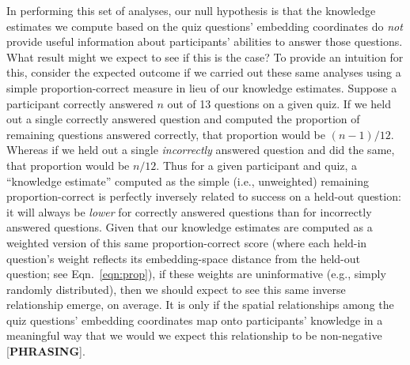 \documentclass[10pt]{article}
\begin{document}
In performing this set of analyses, our null hypothesis is that the knowledge estimates we compute based on the quiz questions' embedding coordinates do \textit{not} provide useful information about participants' abilities to answer those questions. 
What result might we expect to see if this is the case? 
To provide an intuition for this, consider the expected outcome if we carried out these same analyses using a simple proportion-correct measure in lieu of our knowledge estimates. 
Suppose a participant correctly answered $n$ out of 13 questions on a given quiz. 
If we held out a single correctly answered question and computed the proportion of remaining questions answered correctly, that proportion would be $(n - 1) / 12$. 
Whereas if we held out a single \textit{incorrectly} answered question and did the same, that proportion would be $n / 12$. 
Thus for a given participant and quiz, a ``knowledge estimate'' computed as the simple (i.e., unweighted) remaining proportion-correct is perfectly inversely related to success on a held-out question: it will always be \textit{lower} for correctly answered questions than for incorrectly answered questions. 
Given that our knowledge estimates are computed as a weighted version of this same proportion-correct score (where each held-in question's weight reflects its embedding-space distance from the held-out question; see Eqn.~\ref{eqn:prop}), if these weights are uninformative (e.g., simply randomly distributed), then we should expect to see this same inverse relationship emerge, on average. 
It is only if the spatial relationships among the quiz questions' embedding coordinates map onto participants' knowledge in a meaningful way that we would we expect this relationship to be non-negative [\textbf{PHRASING}].
\end{document}
